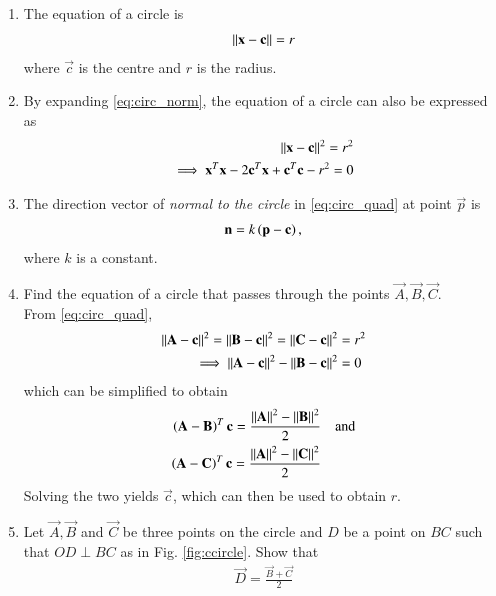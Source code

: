 \renewcommand{\theequation}{\theenumi}
\begin{enumerate}[label=\arabic*.,ref=\thesubsection.\theenumi]
\item The equation of a circle is 
\begin{align}
\label{eq:circ_norm}
\left\lVert\mathbf{x}-\mathbf{c}\right\rVert = r
\end{align}
%
where $\vec{c}$ is the centre and $r$ is the radius.
\item By expanding \eqref{eq:circ_norm}, the equation of a circle can also be expressed as
%
\begin{align}
\label{eq:circ_quad}
\left\lVert\mathbf{x}-\mathbf{c}\right\rVert^2 = r^2&
\\
\implies \mathbf{x}^T\mathbf{x}-2\mathbf{c}^T\mathbf{x} + \mathbf{c}^T\mathbf{c}-r^2 = 0
\end{align}
\item The direction vector of {\em normal to the circle}  in \eqref{eq:circ_quad} at point $\vec{p}$ is
\begin{align}
\label{eq:circ_normal}
\mathbf{n} = k\left(\mathbf{p}-\mathbf{c}\right),
\end{align}
%
where $k$ is a constant.
\item Find the equation of a circle that passes through the points $\vec{A},\vec{B},\vec{C}$.
\\
\solution From \eqref{eq:circ_quad},
\begin{align}
\left\lVert\mathbf{A}-\mathbf{c}\right\rVert^2 = \left\lVert\mathbf{B}-\mathbf{c}\right\rVert^2 = \left\lVert\mathbf{C}-\mathbf{c}\right\rVert^2 &= r^2
\\
\implies \left\lVert\mathbf{A}-\mathbf{c}\right\rVert^2 - \left\lVert\mathbf{B}-\mathbf{c}\right\rVert^2 &=0
\end{align}
which can be simplified to obtain
\begin{align}
\left(\mathbf{A}-\mathbf{B}\right)^T\mathbf{c}=\frac{\left\lVert\mathbf{A}\right\rVert^2 - \left\lVert\mathbf{B}\right\rVert^2}{2}& \quad \text{and}
\\
\left(\mathbf{A}-\mathbf{C}\right)^T\mathbf{c}=\frac{\left\lVert\mathbf{A}\right\rVert^2 - \left\lVert\mathbf{C}\right\rVert^2}{2}& 
\end{align}
%
Solving the two yields $\vec{c}$, which can then be used to obtain $r$.
\item Let $\vec{A},\vec{B}$ and $\vec{C}$ be three points on the circle and 
$D$ be a point on $BC$ such that
$OD \perp BC$ as in Fig. \ref{fig:ccircle}.  Show that 
\begin{align}
\vec{D}=\frac{\vec{B}+\vec{C}}{2}
\end{align}
%
\begin{figure}[!ht]
	\begin{center}
		

\end{center}
\end{figure}
\end{enumerate}
